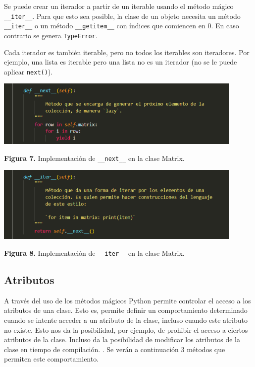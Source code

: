 \documentclass[10pt]{article} %
\newcommand{\csl}[1]{\colorbox{backcolour}{\texttt{#1}}}
\newcommand{\imgcaption}[2]{\tiny \textbf{Figura #1.} #2.}
\newcommand{\mgc}[2][]{\colorbox{backcolour}{\texttt{\_\_#2\_\_#1}}}
\newcommand{\mgccapt}[1]{\texttt{\_\_#1\_\_}}
\begin{document}
Se puede crear un iterador a partir de un iterable usando el m\'etodo m\'agico \mgc{iter}. Para que esto sea posible, la clase de un objeto necesita un método \mgc{iter} o un método \mgc{getitem} con índices que comiencen en 0. En caso contrario se genera \csl{TypeError}. 

Cada iterador es también iterable, pero no todos los iterables son iteradores. Por ejemplo, una lista es iterable pero una lista no es un iterador (no se le puede aplicar \csl{next()}). 

\begin{center}
	\includegraphics[width=12cm]{next.png}
	
	\imgcaption{7}{Implementaci\'on de \mgccapt{next} en la clase Matrix}
\end{center}

\begin{center}
	\includegraphics[width=12cm]{iter.png}
	
	\imgcaption{8}{Implementaci\'on de \mgccapt{iter} en la clase Matrix}
\end{center}

\subsection{Atributos}

A trav\'es del uso de los m\'etodos m\'agicos Python permite controlar el acceso a los atributos de una clase. Esto es, permite definir un comportamiento determinado cuando se intente acceder a un atributo de la clase, incluso cuando este atributo no existe. Esto nos da la posibilidad, por ejemplo, de prohibir el acceso a ciertos atributos de la clase. Incluso da la posibilidad de modificar los atributos de la clase en tiempo de compilaci\'on. . Se ver\'an a continuaci\'on 3  m\'etodos que permiten este comportamiento.
\end{document}

